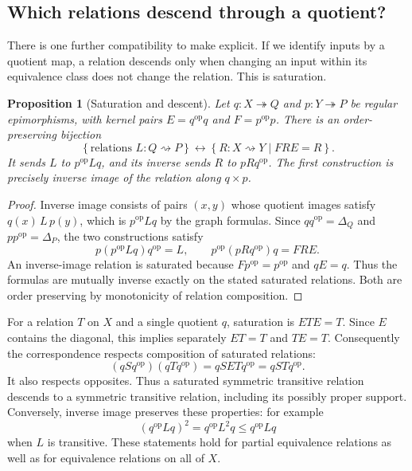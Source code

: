 \documentclass[11pt]{article}
\newtheorem{proposition}[theorem]{Proposition}
\theoremstyle{definition}
\theoremstyle{remark}\newtheorem{remark}[theorem]{Remark}
\begin{document}
\subsection{Which relations descend through a quotient?}

There is one further compatibility to make explicit. If we identify
inputs by a quotient map, a relation descends only when changing an
input within its equivalence class does not change the relation. This
is saturation.

\begin{proposition}[Saturation and descent]\label{d:saturated-descent}
Let $q:X\twoheadrightarrow Q$ and $p:Y\twoheadrightarrow P$ be
regular epimorphisms, with kernel pairs
$E=q^{\mathrm{op}}q$ and $F=p^{\mathrm{op}}p$. There is an
order-preserving bijection
\[
\left\{\text{relations }L:Q\rightsquigarrow P\right\}
\longleftrightarrow
\left\{R:X\rightsquigarrow Y\mid FRE=R\right\}.
\]
It sends $L$ to $p^{\mathrm{op}}Lq$, and its inverse sends $R$ to
$pRq^{\mathrm{op}}$. The first construction is precisely inverse image
of the relation along $q\times p$.
\end{proposition}
\begin{proof}
Inverse image consists of pairs $(x,y)$ whose quotient images satisfy
$q(x)\,L\,p(y)$, which is $p^{\mathrm{op}}Lq$ by the graph formulas.
Since $qq^{\mathrm{op}}=\Delta_Q$ and
$pp^{\mathrm{op}}=\Delta_P$, the two constructions satisfy
\[
p(p^{\mathrm{op}}Lq)q^{\mathrm{op}}=L,
\qquad
p^{\mathrm{op}}(pRq^{\mathrm{op}})q=FRE.
\]
An inverse-image relation is saturated because
$Fp^{\mathrm{op}}=p^{\mathrm{op}}$ and $qE=q$. Thus the formulas are
mutually inverse exactly on the stated saturated relations. Both are
order preserving by monotonicity of relation composition.
\end{proof}

For a relation $T$ on $X$ and a single quotient $q$, saturation is
$ETE=T$. Since $E$ contains the diagonal, this implies separately
$ET=T$ and $TE=T$. Consequently the correspondence respects
composition of saturated relations:
\[
(qSq^{\mathrm{op}})(qTq^{\mathrm{op}})
=qSETq^{\mathrm{op}}=qSTq^{\mathrm{op}}.
\]
It also respects opposites. Thus a saturated symmetric transitive
relation descends to a symmetric transitive relation, including its
possibly proper support. Conversely, inverse image preserves these
properties: for example
\[
(q^{\mathrm{op}}Lq)^2
=q^{\mathrm{op}}L^2q\leq q^{\mathrm{op}}Lq
\]
when $L$ is transitive. These statements hold for partial equivalence
relations as well as for equivalence relations on all of $X$.
\end{document}
